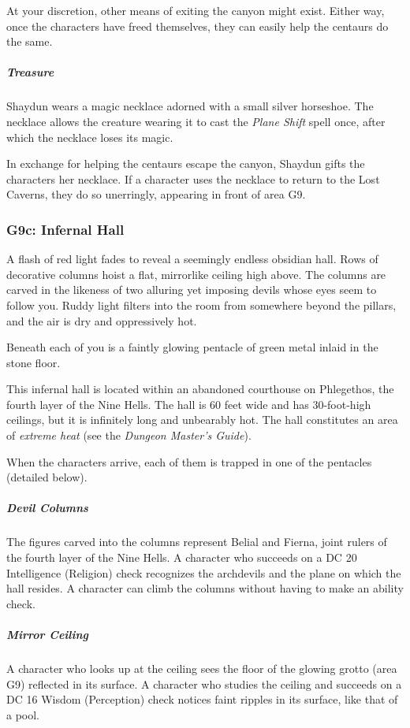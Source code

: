 \documentclass[10pt,a4paper,twoside,bg=print,twocolumn,openany,nodeprecatedcode]{dndbook}
\begin{document}
At your discretion, other means of exiting the canyon might exist. Either way, once the characters have freed themselves, they can easily help the centaurs do the same.

\subparagraph{Treasure}
Shaydun wears a magic necklace adorned with a small silver horseshoe. The necklace allows the creature wearing it to cast the \textit{Plane Shift} spell once, after which the necklace loses its magic.

In exchange for helping the centaurs escape the canyon, Shaydun gifts the characters her necklace. If a character uses the necklace to return to the Lost Caverns, they do so unerringly, appearing in front of area G9.

\subsubsection{G9c: Infernal Hall}
\begin{DndReadAloud}{}
A flash of red light fades to reveal a seemingly endless obsidian hall. Rows of decorative columns hoist a flat, mirrorlike ceiling high above. The columns are carved in the likeness of two alluring yet imposing devils whose eyes seem to follow you. Ruddy light filters into the room from somewhere beyond the pillars, and the air is dry and oppressively hot.

Beneath each of you is a faintly glowing pentacle of green metal inlaid in the stone floor.

\end{DndReadAloud}

This infernal hall is located within an abandoned courthouse on Phlegethos, the fourth layer of the Nine Hells. The hall is 60 feet wide and has 30-foot-high ceilings, but it is infinitely long and unbearably hot. The hall constitutes an area of \textit{extreme heat} (see the \textit{Dungeon Master's Guide}).

When the characters arrive, each of them is trapped in one of the pentacles (detailed below).

\subparagraph{Devil Columns}
The figures carved into the columns represent Belial and Fierna, joint rulers of the fourth layer of the Nine Hells. A character who succeeds on a DC 20 Intelligence (Religion) check recognizes the archdevils and the plane on which the hall resides. A character can climb the columns without having to make an ability check.

\subparagraph{Mirror Ceiling}
A character who looks up at the ceiling sees the floor of the glowing grotto (area G9) reflected in its surface. A character who studies the ceiling and succeeds on a DC 16 Wisdom (Perception) check notices faint ripples in its surface, like that of a pool.
\end{document}
